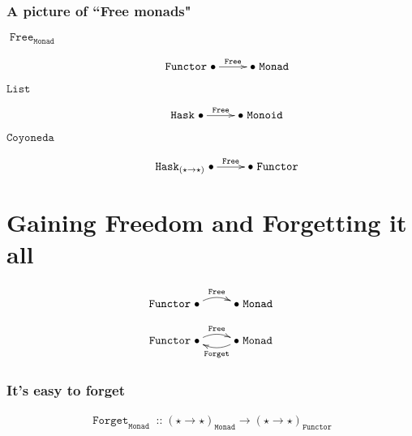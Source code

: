 \documentclass[pdf]{beamer}
\renewcommand{\to}{\ensuremath{\rightarrow}}
\DeclareMathOperator{\Free}{\texttt{Free}}
\DeclareMathOperator{\Forget}{\texttt{Forget}}
\DeclareMathOperator{\Monad}{\texttt{Monad}}
\DeclareMathOperator{\Functor}{\texttt{Functor}}
\DeclareMathOperator{\ty}{\texttt{ :: }}
\begin{document}
\begin{frame}
  \frametitle{A picture of ``Free monads"}
  \begin{description}
  \item[$\Free_{\Monad}$] 
    \begin{displaymath}
      \mathtt{Functor}\xymatrix{\bullet \ar[r]^{\Free} & \bullet}\mathtt{Monad}
    \end{displaymath}
  \pause
  \item[$\mathtt{List}$]
    \begin{displaymath}
      \mathtt{Hask}\xymatrix{\bullet \ar[r]^{\Free} & \bullet}\mathtt{Monoid}
    \end{displaymath}
  \pause
  \item[$\mathtt{Coyoneda}$] 
    \begin{displaymath}
      \mathtt{Hask}_{(\star\to\star)} \xymatrix{\bullet \ar[r]^{\Free} & \bullet}\mathtt{Functor}
    \end{displaymath}
  \end{description}
  
\end{frame}

\section{Gaining Freedom and Forgetting it all}

\begin{frame}
  \begin{center}
    \begin{displaymath}
      \mathtt{Functor}
      \xymatrix{
        \bullet \ar@/^/[r]^{\Free} & 
        \bullet
      }
      \mathtt{Monad}
    \end{displaymath}
  \end{center}
\end{frame}

\begin{frame}
  \begin{center}
    \begin{displaymath}
      \mathtt{Functor}
      \xymatrix{
        \bullet \ar@/^/[r]^{\Free} & 
        \bullet \ar@/^/[l]^{\Forget}
      }
      \mathtt{Monad}
    \end{displaymath}
  \end{center}
\end{frame}

\begin{frame}[fragile]
  \frametitle{It's easy to forget}
  \begin{align*}
    \Forget_{\Monad} \ty 
        (\star \to \star)_{{\Monad}} \to
        (\star \to \star)_{{\Functor}}
  \end{align*}
\end{frame}
\end{document}
